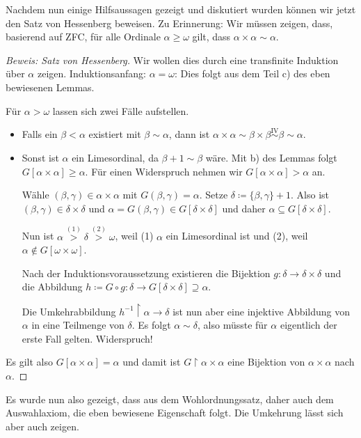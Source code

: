 \documentclass[german]{article}
\theoremstyle{break}
\theoremstyle{def_style}
\theoremstyle{def_style}
\theoremstyle{lemma_style}
\begin{document}
Nachdem nun einige Hilfsaussagen gezeigt und diskutiert wurden können wir jetzt den Satz von Hessenberg beweisen. Zu Erinnerung: Wir müssen zeigen, dass, basierend auf ZFC, für alle Ordinale $\alpha\geq\omega$ gilt, dass $\alpha\times\alpha\sim\alpha$.
\begin{proof}[Beweis: Satz von Hessenberg]
	Wir wollen dies durch eine transfinite Induktion über $\alpha$ zeigen.
	Induktionsanfang: $\alpha=\omega$: Dies folgt aus dem Teil c) des eben bewiesenen Lemmas.
	
	Für $\alpha>\omega$ lassen sich zwei Fälle aufstellen.
	\begin{itemize}
		\item Falls ein $\beta<\alpha$ existiert mit $\beta\sim\alpha$, dann ist $\alpha\times\alpha\sim\beta\times\beta \stackrel{\text{IV}}{\sim} \beta \sim \alpha$.
		\item Sonst ist $\alpha$ ein Limesordinal, da $\beta+1\sim\beta$ wäre. Mit b) des Lemmas folgt $G[\alpha\times\alpha]\geq\alpha$. Für einen Widerspruch nehmen wir $G[\alpha\times\alpha]>\alpha$ an.
		
		Wähle $(\beta,\gamma)\in\alpha\times\alpha$ mit $G(\beta,\gamma)=\alpha$. Setze $\delta\coloneqq\{\beta,\gamma\}+1$. Also ist $(\beta,\gamma)\in\delta\times\delta$ und $\alpha=G(\beta,\gamma)\in G[\delta\times\delta]$ und daher $\alpha\subseteq G[\delta\times\delta]$.
		
		Nun ist $\alpha\stackrel{(1)}{>}\delta\stackrel{(2)}{>}\omega$, weil (1) $\alpha$ ein Limesordinal ist und (2), weil $\alpha\notin G[\omega\times\omega]$.
		
		Nach der Induktionsvoraussetzung existieren die Bijektion $g:\delta\to\delta\times\delta$ und die Abbildung $h\coloneqq G\circ g : \delta\to G[\delta\times\delta]\supseteq\alpha$.
		
		Die Umkehrabbildung $h^{-1}\upharpoonright\alpha\to\delta$ ist nun aber eine injektive Abbildung von $\alpha$ in eine Teilmenge von $\delta$. Es folgt $\alpha\sim\delta$, also müsste für $\alpha$ eigentlich der erste Fall gelten. Widerspruch!
	\end{itemize}
	
	Es gilt also $G[\alpha\times\alpha]=\alpha$ und damit ist $G\upharpoonright\alpha\times\alpha$ eine Bijektion von $\alpha\times\alpha$ nach $\alpha$.
\end{proof}

Es wurde nun also gezeigt, dass aus dem Wohlordnungssatz, daher auch dem Auswahlaxiom, die eben bewiesene Eigenschaft folgt. Die Umkehrung lässt sich aber auch zeigen.
\end{document}
